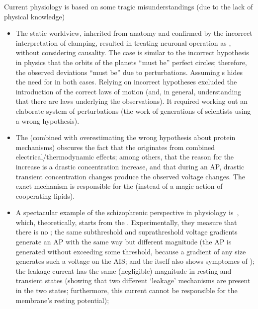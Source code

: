Current physiology is based on some tragic misunderstandings (due to the lack of physical knowledge)
\begin{itemize}
\item The static worldview, inherited from anatomy and confirmed by the incorrect interpretation of clamping, resulted in treating neuronal operation as , without considering causality. 
The case is similar to the incorrect hypothesis in physics that the orbits of the planets “must be” perfect circles; therefore, the observed deviations “must be” due to perturbations.  Assuming s hides the need for  in both cases.
Relying on incorrect hypotheses excluded the introduction of the correct laws of motion (and, in general, understanding that there are laws underlying the observations).
It required working out an elaborate system of perturbations (the work of generations of scientists using a wrong hypothesis).
\item The  (combined with overestimating the wrong hypothesis about protein mechanisms)
obscures the fact that the  originates from combined electrical/thermodynamic effects;
among others, that the reason for the  increase is a drastic concentration increase, and that during an \gls{AP}, drastic transient concentration changes produce the observed voltage changes.
The exact mechanism is responsible for the  (instead of a magic action of cooperating lipids).
\item A spectacular example of the schizophrenic perspective in physiology is~\cite{NeuralEnergyConsumption:2017}, which, theoretically, starts from the .
Experimentally, they measure that there is no ; the same subthreshold and suprathreshold voltage gradients generate an \gls{AP} with the same way but different magnitude (the \gls{AP} is generated without exceeding some threshold, because a gradient of any size generates such a voltage on the \gls{AIS};
and the  itself also shows symptomes of );
 the leakage current has the same (negligible) magnitude in resting and transient states (showing that two different ‘leakage’ mechanisms are present in the two states;
 furthermore, this current cannot be responsible for the membrane’s resting potential);

\end{itemize}
